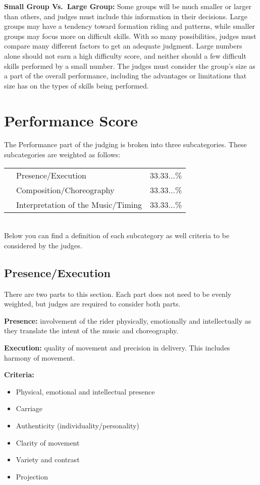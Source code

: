 \textbf{Small Group Vs.\ Large Group:} Some groups will be much smaller or larger than others, and judges must include this information in their decisions.
Large groups may have a tendency toward formation riding and patterns, while smaller groups may focus more on difficult skills.
With so many possibilities, judges must compare many different factors to get an adequate judgment.
Large numbers alone should not earn a high difficulty score, and neither should a few difficult skills performed by a small number.
The judges must consider the group's size as a part of the overall performance, including the advantages or limitations that size has on the types of skills being performed.

\section{Performance Score \label{sec:freestyle_performance-score}}
The Performance part of the judging is broken into three subcategories.
These subcategories are weighted as follows:

\begin{tabular}{l l l}
 & Presence/Execution & 33.33...\% \\
 & Composition/Choreography & 33.33...\% \\
 & Interpretation of the Music/Timing & 33.33...\% \\
\end{tabular}\\

Below you can find a definition of each subcategory as well criteria to be considered by the judges.

\subsection{Presence/Execution}
There are two parts to this section.
Each part does not need to be evenly weighted, but judges are required to consider both parts.

\textbf{Presence:} involvement of the rider physically, emotionally and intellectually as they translate the intent of the music and choreography.

\textbf{Execution:} quality of movement and precision in delivery.
This includes harmony of movement.

\textbf{Criteria:}
\begin{itemize}
\item Physical, emotional and intellectual presence
\item Carriage
\item Authenticity (individuality/personality)
\item Clarity of movement
\item Variety and contrast
\item Projection
\end{itemize}

